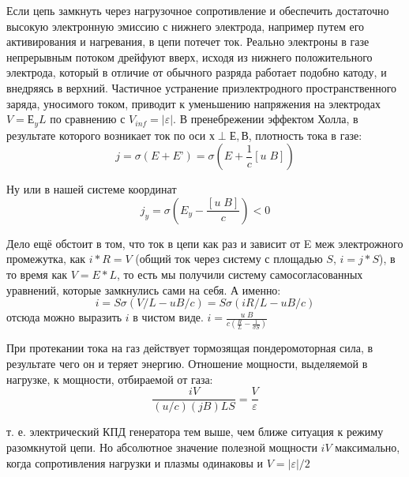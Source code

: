 \documentclass[10pt, a4paper]{article}
\begin{document}
Если цепь замкнуть через нагрузочное сопротивление и обеспечить достаточно высокую электронную эмиссию с нижнего электрода, например путем его активирования и нагревания, в цепи потечет ток. Реально электроны в газе непрерывным потоком дрейфуют вверх, исходя из нижнего положительного электрода, который в отличие от обычного разряда работает подобно катоду, и внедряясь в верхний. Частичное устранение приэлектродного пространственного заряда, уносимого током, приводит к уменьшению напряжения на электродах $V= Е_{y} L$ по сравнению с $V_{inf}=|\varepsilon|$. В пренебрежении эффектом Холла, в результате которого возникает ток по оси $х \perp Е, В$, плотность тока в газе:
\begin{equation}
	j=\sigma(E+E’)=\sigma(E+\frac{1}{c}[u\;B])
\end{equation}

Ну или в нашей системе координат 
\begin{equation}
	j_y=\sigma(E_y-\frac{[u\;B]}{c}) <0
\end{equation}

Дело ещё обстоит в том, что ток в цепи как раз и зависит от E меж электрожного промежутка, как $i*R=V$ (общий ток через систему с площадью $S$, $i=j*S$), в то время как $V=E*L$, то есть мы получили систему самосогласованных уравнений, которые замкнулись сами на себя. А именно:
\begin{equation}
	i=S \sigma(V/L-uB/c)=S \sigma(iR/L-uB/c)
\end{equation}
отсюда можно выразить $i$ в чистом виде. $i=\frac{u\;B}{c(\frac{R}{L}-\frac{1}{\sigma S})}$

При протекании тока на газ действует тормозящая пондеромоторная сила, в результате чего он и теряет энергию. Отношение мощности, выделяемой в нагрузке, к мощности, отбираемой от газа: 
\begin{equation}
	\frac{iV}{(u/c)(jB)LS}=\frac{V}{\varepsilon}
\end{equation}

т. е. электрический КПД генератора тем выше, чем ближе ситуация к режиму разомкнутой цепи. Но абсолютное значение полезной мощности $iV$ максимально, когда сопротивления нагрузки и плазмы одинаковы и $V=|\varepsilon|/2$



\newpage
{}


\end{document}
